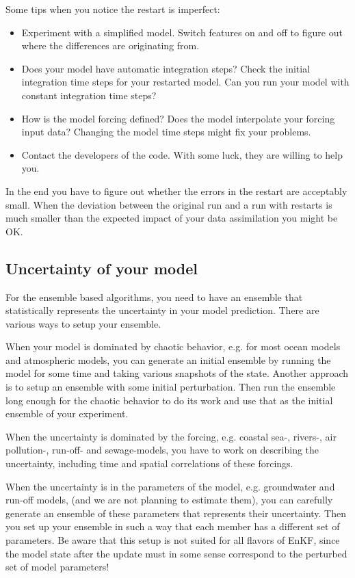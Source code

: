 \documentclass[a4paper,10pt]{article}
\begin{document}
Some tips when you notice the restart is imperfect:
\begin{itemize}
\item Experiment with a simplified model. Switch features on and off to figure out where the differences are originating from.
\item Does your model have automatic integration steps? Check the initial integration time steps for your restarted model. Can you run your model with constant integration time steps?
\item How is the model forcing defined? Does the model interpolate your forcing input data? Changing the model time steps might fix your problems.
\item Contact the developers of the code. With some luck, they are willing to help you.
\end{itemize}

In the end you have to figure out whether the errors in the restart are acceptably small. When the deviation between the original run and a run with restarts is much smaller than the expected impact of your data assimilation you might be OK.

\subsection{Uncertainty of your model}
For the ensemble based algorithms, you need to have an ensemble that statistically represents the uncertainty in your model prediction. There are various ways to setup your ensemble. 

When your model is dominated by chaotic behavior, e.g. for most ocean models and atmospheric models, you can generate an initial ensemble by running the model for some time and taking various snapshots of the state. Another approach is to setup an ensemble with some initial perturbation. Then run the ensemble long enough for the chaotic behavior to do its work and use that as the initial ensemble of your experiment.

When the uncertainty is dominated by the forcing, e.g. coastal sea-, rivers-, air pollution-, run-off- and sewage-models, you have to work on describing the uncertainty, including time and spatial correlations of these forcings.

When the uncertainty is in the parameters of the model, e.g.  groundwater and run-off models, (and we are not planning to estimate them), you can carefully generate an ensemble of these parameters that represents their uncertainty. Then you set up your ensemble in such a way that each member has a different set of parameters.  Be aware that this setup is not suited for all flavors of EnKF, since the model state after the update must in some sense correspond to the perturbed set of model parameters!
\end{document}
